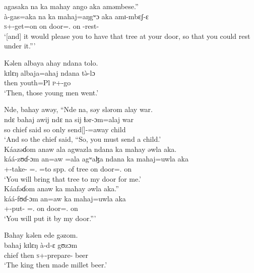  \medskip
 agasaka  na  ka  mahay  ango  aka  aməmbese.”\\
\gll 	à-gas=aka   na  ka    mahaj=aŋgʷɔ aka  amɪ-mbɛʃ-ɛ\\
	\textsc{s}+{\PFV}-get=on  {\PSP}   on     door={\twoS}.{\POSS}  on  {\DEP}-rest-{\CL}\\
 \glt ‘[and] it would please you to have that tree at your door, so that you could rest under it.”’
 \z

\ea     Kəlen  albaya  ahay  ndana  tolo.  \\
 \gll kɪlɛŋ  albaja=ahaj  ndana  t\`ə-lɔ\\
 then   youth=Pl     {\DEM}   \textsc{p}+{\PFV}-go\\ 
 \glt ‘Then, those young men went.’
 \z

\ea     Nde, bahay awəy,  “Nde na,  səy  slərom  alay  war.\\
 \gll ndɛ bahaj   awij     ndɛ  na  sij  ɬər-ɔm=alaj         war\\
 so    chief  said  so  {\PSP}  only  {send[{\IMP}]-{\twoP}}=away   child\\
  \glt ‘And so the chief said, “So, you must send a child.’\\
  
  \medskip
  Káazəɗom  anaw  ala  agwazla  ndana  ka  mahay  əwla  aka.\\
  \gll káá{}-zʊɗ{}-ɔm    an=aw    =ala    agʷaɮa    ndana    ka   mahaj=uwla      aka\\
  {\twoP}+{\POT}-take-{\twoP}      {\DAT}={\oneS}.{\IO}  =to       {spp. of tree}   {\DEM}   on   door={\oneS}.{\POSS}  on\\
  \glt ‘You will bring that tree to my door for me.’\\
  
  \medskip
 Káafəɗom  anaw  ka  mahay  əwla  aka.”\\
 \gll káá{}-fʊɗ{}-ɔm          an=aw      ka   mahaj=uwla     aka\\
  {\twoP}+{\POT}-put-{\twoP}    {\DAT}={\oneS}.{\IO}   on  door={\oneS}.{\POSS}   on\\
  \glt ‘You will put it by my door.”’ 
  \z

\ea Bahay  kəlen  ede  gəzom.  \\
 \gll bahaj  kɪlɛŋ  à-d-ɛ                 gʊzɔm\\
  chief  then  \textsc{s}+{\PFV}-prepare{}-{\CL}  beer\\
  \glt ‘The king then made millet beer.’
  \z

